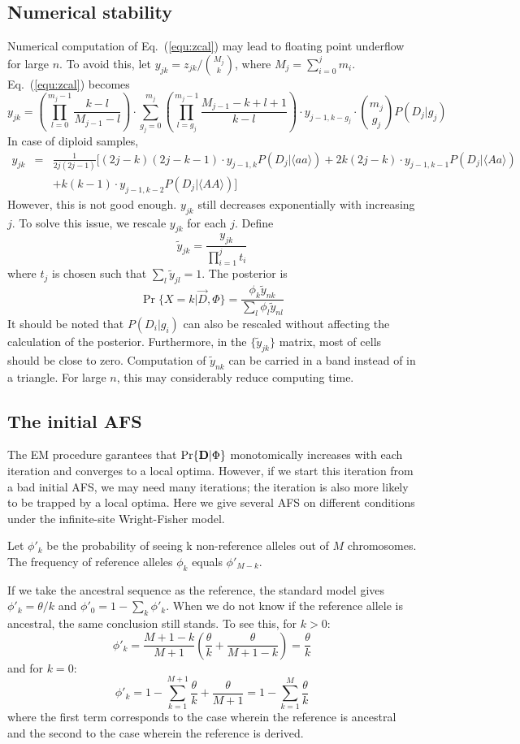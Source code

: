 \documentclass[pdftex,10pt]{book}
\begin{document}
\subsection{Numerical stability}\label{sec:numsta}
Numerical computation of Eq.~(\ref{equ:zcal}) may lead to floating point
underflow for large $n$. To avoid this, let
$y_{jk}=z_{jk}/\binom{M_j}{k}$, where
$M_j=\sum_{i=0}^jm_i$. Eq.~(\ref{equ:zcal}) becomes
$$
y_{jk}=\left(\prod_{l=0}^{m_j-1}\frac{k-l}{M_{j-1}-l}\right)\cdot\sum_{g_j=0}^{m_j}\left(\prod_{l=g_j}^{m_j-1}\frac{M_{j-1}-k+l+1}{k-l}\right)\cdot y_{j-1,k-g_j}\cdot\binom{m_j}{g_j}P(D_j|g_j)
$$
In case of diploid samples,
\begin{eqnarray*}
y_{jk}&=&\frac{1}{2j(2j-1)}\Big[(2j-k)(2j-k-1)\cdot y_{j-1,k}P(D_j|\langle aa\rangle)+2k(2j-k)\cdot y_{j-1,k-1}P(D_j|\langle Aa\rangle)\\
&&+k(k-1)\cdot y_{j-1,k-2}P(D_j|\langle AA\rangle)\Big]
\end{eqnarray*}
However, this is not good enough. $y_{jk}$ still decreases exponentially
with increasing $j$. To solve this issue, we rescale $y_{jk}$ for each
$j$. Define
$$
\tilde{y}_{jk}=\frac{y_{jk}}{\prod_{i=1}^j t_i}
$$
where $t_j$ is chosen such that $\sum_l\tilde{y}_{jl}=1$. The posterior is
$$
\Pr\{X=k|\vec{D},\Phi\}=\frac{\phi_k\tilde{y}_{nk}}{\sum_l\phi_l\tilde{y}_{nl}}
$$
It should be noted that $P(D_i|g_i)$ can also be rescaled without
affecting the calculation of the posterior. Furthermore, in the
$\{\tilde{y}_{jk}\}$ matrix, most of cells should be close to
zero. Computation of $\tilde{y}_{nk}$ can be carried in a band instead
of in a triangle. For large $n$, this may considerably reduce computing
time.

\subsection{The initial AFS}
The EM procedure garantees that $\Pr\{{\bf D}|\Phi\}$ monotomically
increases with each iteration and converges to a local optima. However,
if we start this iteration from a bad initial AFS, we may need many
iterations; the iteration is also more likely to be trapped by a local
optima. Here we give several AFS on different conditions under the
infinite-site Wright-Fisher model.

Let $\phi'_k$ be the probability of seeing k non-reference alleles out
of $M$ chromosomes. The frequency of reference alleles $\phi_k$ equals
$\phi'_{M-k}$.

If we take the ancestral sequence as the reference, the standard model
gives $\phi'_k=\theta/k$ and $\phi'_0=1-\sum_k\phi'_k$. When we do not
know if the reference allele is ancestral, the same conclusion still
stands. To see this, for $k>0$:
$$
\phi'_k=\frac{M+1-k}{M+1}\left(\frac{\theta}{k}+\frac{\theta}{M+1-k}\right)=\frac{\theta}{k}
$$
and for $k=0$:
$$
\phi'_k=1-\sum_{k=1}^{M+1}\frac{\theta}{k}+\frac{\theta}{M+1}=1-\sum_{k=1}^{M}\frac{\theta}{k}
$$
where the first term corresponds to the case wherein the reference is
ancestral and the second to the case wherein the reference is derived.
\end{document}
